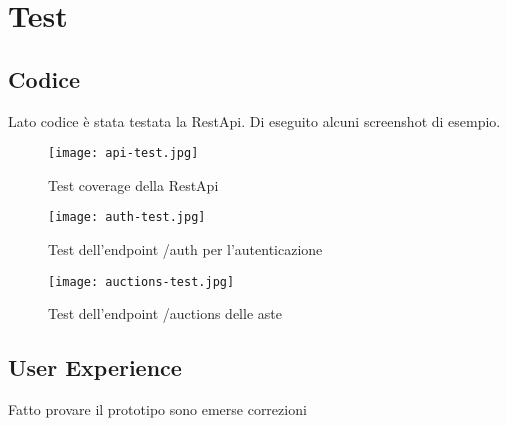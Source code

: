 \section{Test}

\subsection{Codice}
Lato codice è stata testata la RestApi.
Di eseguito alcuni screenshot di esempio.

\begin{figure}[H]
	\centering
	\texttt{[image: api-test.jpg]}
	\caption{Test coverage della RestApi}
	\label{fig:apiTest}
\end{figure}

\begin{figure}[H]
	\centering
	\texttt{[image: auth-test.jpg]}
	\caption{Test dell'endpoint /auth per l'autenticazione}
	\label{fig:authTest}
\end{figure}

\begin{figure}[H]
	\centering
	\texttt{[image: auctions-test.jpg]}
	\caption{Test dell'endpoint /auctions delle aste}
	\label{fig:auctionsTest}
\end{figure}

\clearpage

\subsection{User Experience}
Fatto provare il prototipo
sono emerse correzioni